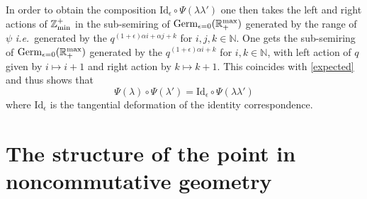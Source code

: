 \documentclass[noams,lp]{compositio}
\def\id{{\rm id}}
\def\N{{\mathbb N}}
\def\R{{\mathbb R}}
\def\Z{{\mathbb Z}}
\newcommand{\ie}{{\it i.e.\/}\ }
\def\zminp{\Z_{\rm min}^+}
\def\id{{\mbox{Id}}}
\def\rmax{\R_+^{\rm max}}
\def\germ{{{\rm Germ}_{\epsilon=0}(\rmax)}}
\begin{document}
In order to obtain the composition $\id_\epsilon\circ \Psi(\lambda\lambda')$ one then takes the left and right actions of $\zminp$ in the sub-semiring  of $\germ$ generated by the range of $\psi$ \ie generated by the $q^{(1+\epsilon)\alpha i+\alpha j+k}$ for $i,j,k\in\N$. One gets the sub-semiring  of $\germ$  generated by the $q^{(1+\epsilon)\alpha i +k}$ for $i,k\in\N$, with left action of $q$ given by $i\mapsto i+1$ and right action by $k\mapsto k+1$. This coincides with \eqref{expected} and thus shows that 
$$
\Psi(\lambda)\circ \Psi(\lambda')=\id_\epsilon\circ \Psi(\lambda\lambda')
$$
where $\id_\epsilon$ is the tangential deformation of the identity correspondence.



\section{The structure of the point in noncommutative geometry}\label{sectncg}
\end{document}

